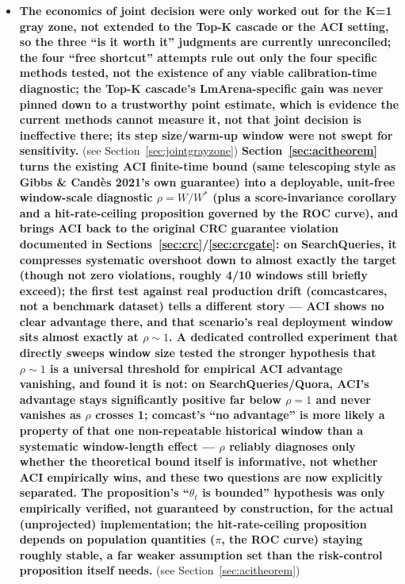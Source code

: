 \documentclass[11pt]{article}
\begin{document}
\begin{itemize}[leftmargin=*]
  \item \textbf{The economics of joint decision were only worked out for the K=1 gray zone, not extended to the Top-K cascade or the ACI setting, so the three ``is it worth it'' judgments are currently unreconciled; the four ``free shortcut'' attempts rule out only the four specific methods tested, not the existence of any viable calibration-time diagnostic; the Top-K cascade's LmArena-specific gain was never pinned down to a trustworthy point estimate, which is evidence the current methods cannot measure it, not that joint decision is ineffective there; its step size/warm-up window were not swept for sensitivity.} (see Section~\ref{sec:jointgrayzone}) \textbf{Section~\ref{sec:acitheorem} turns the existing ACI finite-time bound (same telescoping style as Gibbs \& Cand\`es 2021's own guarantee) into a deployable, unit-free window-scale diagnostic $\rho = W/W^*$ (plus a score-invariance corollary and a hit-rate-ceiling proposition governed by the ROC curve), and brings ACI back to the original CRC guarantee violation documented in Sections~\ref{sec:crc}/\ref{sec:crcgate}: on SearchQueries, it compresses systematic overshoot down to almost exactly the target (though not zero violations, roughly 4/10 windows still briefly exceed); the first test against real production drift (comcastcares, not a benchmark dataset) tells a different story --- ACI shows no clear advantage there, and that scenario's real deployment window sits almost exactly at $\rho \sim 1$. A dedicated controlled experiment that directly sweeps window size tested the stronger hypothesis that $\rho \sim 1$ is a universal threshold for empirical ACI advantage vanishing, and found it is not: on SearchQueries/Quora, ACI's advantage stays significantly positive far below $\rho=1$ and never vanishes as $\rho$ crosses 1; comcast's ``no advantage'' is more likely a property of that one non-repeatable historical window than a systematic window-length effect --- $\rho$ reliably diagnoses only whether the theoretical bound itself is informative, not whether ACI empirically wins, and these two questions are now explicitly separated. The proposition's ``$\theta_t$ is bounded'' hypothesis was only empirically verified, not guaranteed by construction, for the actual (unprojected) implementation; the hit-rate-ceiling proposition depends on population quantities ($\pi$, the ROC curve) staying roughly stable, a far weaker assumption set than the risk-control proposition itself needs.} (see Section~\ref{sec:acitheorem})
\end{itemize}
\end{document}
